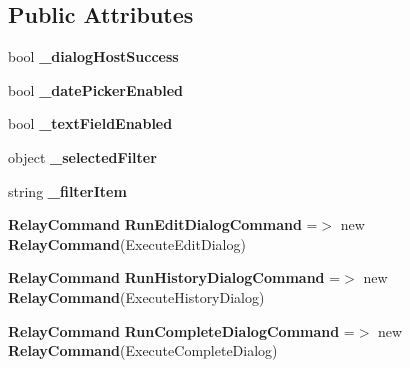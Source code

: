 \subsection*{Public Attributes}
\begin{DoxyCompactItemize}
\item 
\mbox{\label{class_a_f_h___scheduler_1_1_data_v_m_ac3ae52efa3a2c9337a6752bfbd48903c}} 
bool {\bfseries \+\_\+dialog\+Host\+Success}
\item 
\mbox{\label{class_a_f_h___scheduler_1_1_data_v_m_aefa508463865036327d1ddb9cedcb566}} 
bool {\bfseries \+\_\+date\+Picker\+Enabled}
\item 
\mbox{\label{class_a_f_h___scheduler_1_1_data_v_m_a26fd17276f6646b253296b66254a1fb8}} 
bool {\bfseries \+\_\+text\+Field\+Enabled}
\item 
\mbox{\label{class_a_f_h___scheduler_1_1_data_v_m_a53a22b8af96fde4b0bad2d01edf4c7cb}} 
object {\bfseries \+\_\+selected\+Filter}
\item 
\mbox{\label{class_a_f_h___scheduler_1_1_data_v_m_ab7bb07e73c2b8c03bac602e7a2909f0f}} 
string {\bfseries \+\_\+filter\+Item}
\item 
\mbox{\label{class_a_f_h___scheduler_1_1_data_v_m_ab7fdf809f0fd89e322caeb4400e6da55}} 
\textbf{ Relay\+Command} {\bfseries Run\+Edit\+Dialog\+Command} =$>$ new \textbf{ Relay\+Command}(Execute\+Edit\+Dialog)
\item 
\mbox{\label{class_a_f_h___scheduler_1_1_data_v_m_a454bb7b2ea4bf821153389d2fd6c2f17}} 
\textbf{ Relay\+Command} {\bfseries Run\+History\+Dialog\+Command} =$>$ new \textbf{ Relay\+Command}(Execute\+History\+Dialog)
\item 
\mbox{\label{class_a_f_h___scheduler_1_1_data_v_m_a984ff3237a571e2bcdabbbbbb3e9b38a}} 
\textbf{ Relay\+Command} {\bfseries Run\+Complete\+Dialog\+Command} =$>$ new \textbf{ Relay\+Command}(Execute\+Complete\+Dialog)
\end{DoxyCompactItemize}
